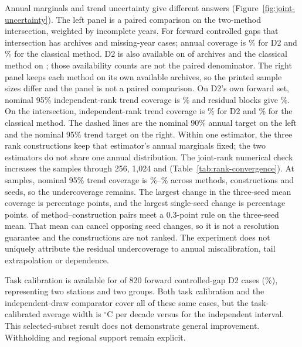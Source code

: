 Annual marginals and trend uncertainty give different answers (Figure~\ref{fig:joint-uncertainty}). The left panel is a paired comparison on the two-method intersection, weighted by incomplete years. For forward controlled gaps that intersection has \CCPairFwdN{} archives and \CCPairFwdYears{} missing-year cases; annual coverage is \CCPairFwdDTwoAnnual\% for D2 and \CCPairFwdClassicAnnual\% for the classical method. D2 is also available on \CCOwnFwdDTwoN{} of \CCOwnFwdAll{} archives and the classical method on \CCOwnFwdClassicN{}; those availability counts are not the paired denominator. The right panel keeps each method on its own available archives, so the printed sample sizes differ and the panel is not a paired comparison. On D2's own forward set, nominal 95\% independent-rank trend coverage is \WAForwardCoverage\% and residual blocks give \WABlockForwardCoverage\%. On the intersection, independent-rank trend coverage is \CCPairFwdDTwoTrend\% for D2 and \CCPairFwdClassicTrend\% for the classical method. The dashed lines are the nominal 90\% annual target on the left and the nominal 95\% trend target on the right. Within one estimator, the three rank constructions keep that estimator's annual marginals fixed; the two estimators do not share one annual distribution. The joint-rank numerical check increases the samples through 256, 1,024 and \CCRankDTwoDraws{} (Table~\ref{tab:rank-convergence}). At \CCRankDTwoDraws{} samples, nominal 95\% trend coverage is \CCRankStochCovLow\%--\CCRankDTwoCovHigh\% across methods, constructions and seeds, so the undercoverage remains. The largest change in the three-seed mean coverage is \CCRankChangeMax{} percentage points, and the largest single-seed change is \CCRankSeedChangeMax{} percentage points. \CCRankStable{} of \CCRankTotal{} method--construction pairs meet a 0.3-point rule on the three-seed mean. That mean can cancel opposing seed changes, so it is not a resolution guarantee and the constructions are not ranked. The experiment does not uniquely attribute the residual undercoverage to annual miscalibration, tail extrapolation or dependence.

Task calibration is available for \WATaskForwardN{} of 820 forward controlled-gap D2 cases (\WATaskForwardPercent\%), representing two stations and two groups. Both task calibration and the independent-draw comparator cover all of these same cases, but the task-calibrated average width is \CCTaskWidthCal{} $^{\circ}$C per decade versus \CCTaskWidthBase{} for the independent interval. This selected-subset result does not demonstrate general improvement. Withholding and regional support remain explicit.

